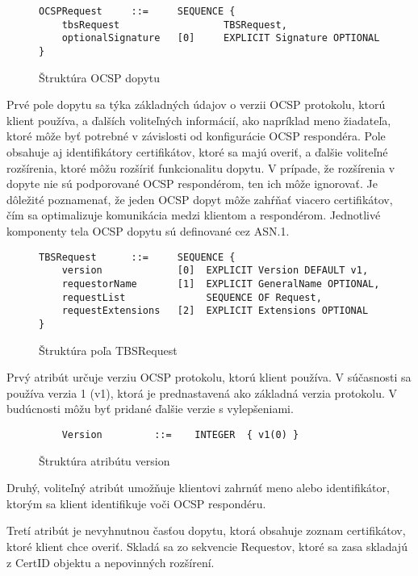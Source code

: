 \documentclass[12pt, twoside]{book}
\begin{document}
\begin{figure}[H]
\begin{lstlisting}
OCSPRequest     ::=     SEQUENCE {
    tbsRequest                  TBSRequest,
    optionalSignature   [0]     EXPLICIT Signature OPTIONAL
}
\end{lstlisting}
\caption{Štruktúra OCSP dopytu}
\end{figure}

Prvé pole dopytu sa týka základných údajov o verzii OCSP protokolu, ktorú klient používa, a ďalších voliteľných informácií, ako napríklad meno žiadateľa, ktoré môže byť potrebné v závislosti od konfigurácie OCSP respondéra. Pole obsahuje aj identifikátory certifikátov, ktoré sa majú overiť, a ďalšie voliteľné rozšírenia, ktoré môžu rozšíriť funkcionalitu dopytu. V prípade, že rozšírenia v dopyte nie sú podporované OCSP respondérom, ten ich môže ignorovať. Je dôležité poznamenať, že jeden OCSP dopyt môže zahŕňať viacero certifikátov, čím sa optimalizuje komunikácia medzi klientom a respondérom. Jednotlivé komponenty tela OCSP dopytu sú definované cez ASN.1.\cite{rfc6960}

\begin{figure}[H]
\begin{lstlisting}
TBSRequest      ::=     SEQUENCE {
    version             [0]  EXPLICIT Version DEFAULT v1,
    requestorName       [1]  EXPLICIT GeneralName OPTIONAL,
    requestList              SEQUENCE OF Request,
    requestExtensions   [2]  EXPLICIT Extensions OPTIONAL
}   
\end{lstlisting}
\caption{Štruktúra poľa TBSRequest}
\end{figure}

Prvý atribút určuje verziu OCSP protokolu, ktorú klient používa. V súčasnosti sa používa verzia 1 (v1), ktorá je prednastavená ako základná verzia protokolu. V budúcnosti môžu byť pridané ďalšie verzie s vylepšeniami.\cite{rfc6960}

\begin{figure}[H]
\begin{lstlisting}
    Version         ::=    INTEGER  { v1(0) }
\end{lstlisting}
\caption{Štruktúra atribútu  version}
\end{figure}

Druhý, voliteľný atribút umožňuje klientovi zahrnúť meno alebo identifikátor, ktorým sa klient identifikuje voči OCSP respondéru. \cite{rfc6960}

Tretí atribút je nevyhnutnou časťou dopytu, ktorá obsahuje zoznam certifikátov, ktoré klient chce overiť. Skladá sa zo sekvencie Requestov, ktoré sa zasa skladajú z CertID objektu a nepovinných rozšírení.\cite{rfc6960}
\end{document}
